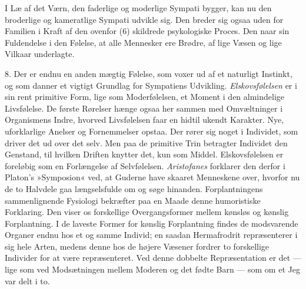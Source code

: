 \documentclass[12pt,a4paper,openany]{book}
\newcommand{\opage}[1]{\marginnote{\footnotesize\textit{[#1]}}}
\begin{document}
I Læ af det Værn, den faderlige og moderlige Sympati bygger, kan nu den
broderlige og kameratlige Sympati udvikle sig. Den breder sig ogsaa uden
for Familien i Kraft af den ovenfor (6) skildrede psykologiske Proces.
Den naar sin Fuldendelse i den Følelse, at alle Mennesker ere Brødre, af
lige Væsen og lige Vilkaar underlagte.

8. Der er endnu en anden mægtig Følelse, som voxer ud af et naturligt
Instinkt, og som danner et vigtigt Grundlag for Sympatiens Udvikling.
\emph{Elskovsfølelsen} er i sin rent primitive Form, lige som
Moderfølelsen, et Moment i den almindelige Livsfølelse. De første
Rørelser hænge ogsaa her sammen med Omvæltninger i Organismens Indre,
hvorved Livsfølelsen faar en hidtil ukendt Karakter. Nye, uforklarlige
Anelser og Fornemmelser opstaa. Der rører sig noget i Individet, som
driver det ud over det selv. Men paa de
\opage{301}primitive Trin betragter Individet den Genstand, til hvilken
Driften knytter det, kun som Middel. Elskovsfølelsen er foreløbig som en
Forlængelse af Selvfølelsen. \emph{Aristofanes} forklarer den derfor i
Platon’s »Symposion« ved, at Guderne have skaaret Menneskene over,
hvorfor nu de to Halvdele gaa længselsfulde om og søge hinanden.
Forplantningens sammenlignende Fysiologi bekræfter paa en Maade denne
humoristiske Forklaring. Den viser os forskellige Overgangsformer mellem
kønsløs og kønslig Forplantning. I de laveste Former for kønslig
Forplantning findes de modsvarende Organer endnu hos et og samme
Individ; en saadan Hermafrodrit repræsenterer i sig hele Arten, medens
denne hos de højere Væsener fordrer to forskellige Individer for at være
repræsenteret. Ved denne dobbelte Repræsentation er det --- lige som ved
Modsætningen mellem Moderen og det fødte Barn --- som om et Jeg var delt
i to.
\end{document}
